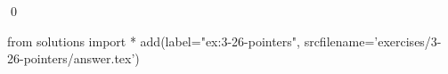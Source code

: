 
\begin{ex}
  \label{ex:3-26-pointers}
  
  \qed
\end{ex}
\begin{python0}
from solutions import *
add(label="ex:3-26-pointers",
    srcfilename='exercises/3-26-pointers/answer.tex')
\end{python0}
